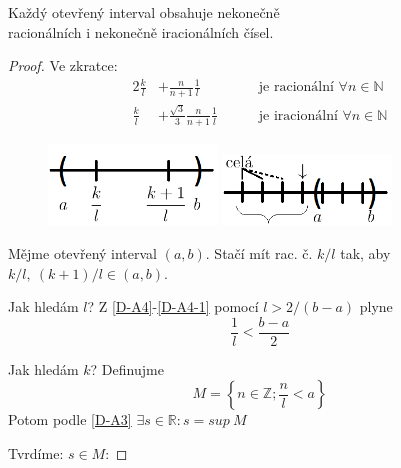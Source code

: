 \begin{theorem}
Každý otevřený interval obsahuje nekonečně \\ racionálních i nekonečně iracionálních čísel.
\end{theorem}
\begin{proof}
	Ve zkratce:
	\begin{alignat}{2}
		\frac{k}{l}&+\frac{n}{n+1}\frac{1}{l} &&\quad\text{ je racionální }\forall n\in\mathbb{N} \\
		\frac{k}{l}&+\frac{\sqrt{3}}{3}\frac{n}{n+1}\frac{1}{l} &&\quad\text{ je iracionální }\forall n\in\mathbb{N}
	\end{alignat}
	\begin{figure}[ht!]
		\begin{center}
			\includegraphics[width=0.4\textwidth,keepaspectratio]{../img/chapter1/interval.png}
			\includegraphics[width=0.4\textwidth,keepaspectratio]{../img/chapter1/interval2.png}
		\end{center}
	\end{figure}\FloatBarrier
	
	Mějme otevřený interval $(a,b)$. Stačí mít rac. č. $k/l$ tak, aby \\$k/l,~(k+1)/l\in(a,b)$.
	
	Jak hledám $l$? Z \autoref*{D-A4}-\autoref{D-A4-1} pomocí $l>2/(b-a)$ plyne
	\begin{equation}
		\frac{1}{l}<\frac{b-a}{2}
	\end{equation}
	
	Jak hledám $k$? Definujme
	\begin{equation}
		M=\left\{n\in\mathbb{Z};\frac{n}{l}<a\right\}
	\end{equation}
	Potom podle \autoref{D-A3} $\exists s\in\mathbb{R}:s=sup~M$

	Tvrdíme: $s\in M$:


\end{proof}
